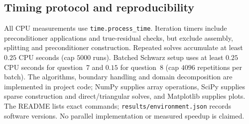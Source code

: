 \documentclass[10pt,a4paper]{article}
\begin{document}
\subsection{Timing protocol and reproducibility}
All CPU measurements use \texttt{time.process\_time}. Iteration timers
include preconditioner applications and true-residual checks, but exclude
assembly, splitting and preconditioner construction. Repeated solves
accumulate at least $0.25$ CPU seconds (cap $5000$ runs). Batched Schwarz
setup uses at least $0.25$ CPU seconds for question~7 and $0.15$ for
question~8 (cap $4096$ repetitions per batch).
The algorithms, boundary handling and domain decomposition are implemented
in project code; NumPy supplies array operations, SciPy supplies sparse
construction and direct/triangular solves, and Matplotlib supplies plots.
The README lists exact commands; \texttt{results/environment.json} records
software versions. No parallel implementation or measured speedup is claimed.
\end{document}
